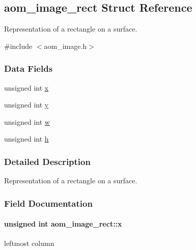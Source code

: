 \hypertarget{structaom__image__rect}{}\subsection{aom\+\_\+image\+\_\+rect Struct Reference}
\label{structaom__image__rect}


Representation of a rectangle on a surface.  




{\ttfamily \#include $<$aom\+\_\+image.\+h$>$}

\subsubsection*{Data Fields}
\begin{DoxyCompactItemize}
\item 
unsigned int \hyperlink{structaom__image__rect_a65666b611b562e24a50ff180c13e6120}{x}
\item 
unsigned int \hyperlink{structaom__image__rect_ad96b4a0053a7b2d145f709f903a13cff}{y}
\item 
unsigned int \hyperlink{structaom__image__rect_aed38fa7222f10a140eded2293da8df10}{w}
\item 
unsigned int \hyperlink{structaom__image__rect_aa018a037ad51dc1ed6e3208e66ba1ca3}{h}
\end{DoxyCompactItemize}


\subsubsection{Detailed Description}
Representation of a rectangle on a surface. 

\subsubsection{Field Documentation}
\paragraph[{\texorpdfstring{x}{x}}]{\setlength{\rightskip}{0pt plus 5cm}unsigned int aom\+\_\+image\+\_\+rect\+::x}\hypertarget{structaom__image__rect_a65666b611b562e24a50ff180c13e6120}{}\label{structaom__image__rect_a65666b611b562e24a50ff180c13e6120}
leftmost column 
